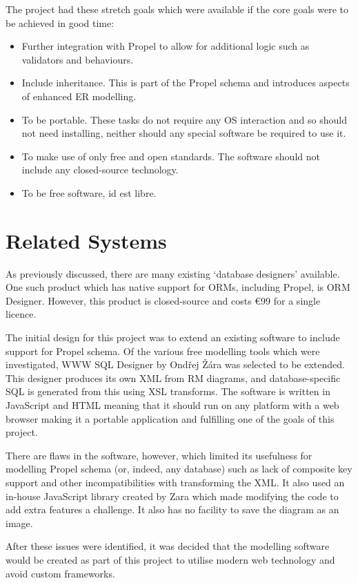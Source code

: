 The project had these stretch goals which were available if the core goals were to be achieved in good time:
\begin{itemize}
	\item Further integration with Propel to allow for additional logic such as validators and behaviours.
	\item Include inheritance. This is part of the Propel schema and introduces aspects of enhanced ER modelling.
	\item To be portable. These tasks do not require any OS interaction and so should not need installing, neither should any special software be required to use it.
	\item To make use of only free and open standards. The software should not include any closed-source technology.
	\item To be free software, id est libre.
\end{itemize}

\section{Related Systems}
As previously discussed, there are many existing `database designers' available. One such product which has native support for ORMs, including Propel, is ORM Designer. However, this product is closed-source and costs \euro99 for a single licence.

The initial design for this project was to extend an existing software to include support for Propel schema. Of the various free modelling tools which were investigated, WWW SQL Designer by Ond\v{r}ej \v{Z}\'{a}ra was selected to be extended. This designer produces its own XML from RM diagrams, and database-specific SQL is generated from this using XSL transforms. The software is written in JavaScript and HTML meaning that it should run on any platform with a web browser making it a portable application and fulfilling one of the goals of this project.

There are flaws in the software, however, which limited its usefulness for modelling Propel schema (or, indeed, any database) such as lack of composite key support and other incompatibilities with transforming the XML. It also used an in-house JavaScript library created by Zara which made modifying the code to add extra features a challenge. It also has no facility to save the diagram as an image.

After these issues were identified, it was decided that the modelling software would be created as part of this project to utilise modern web technology and avoid custom frameworks.